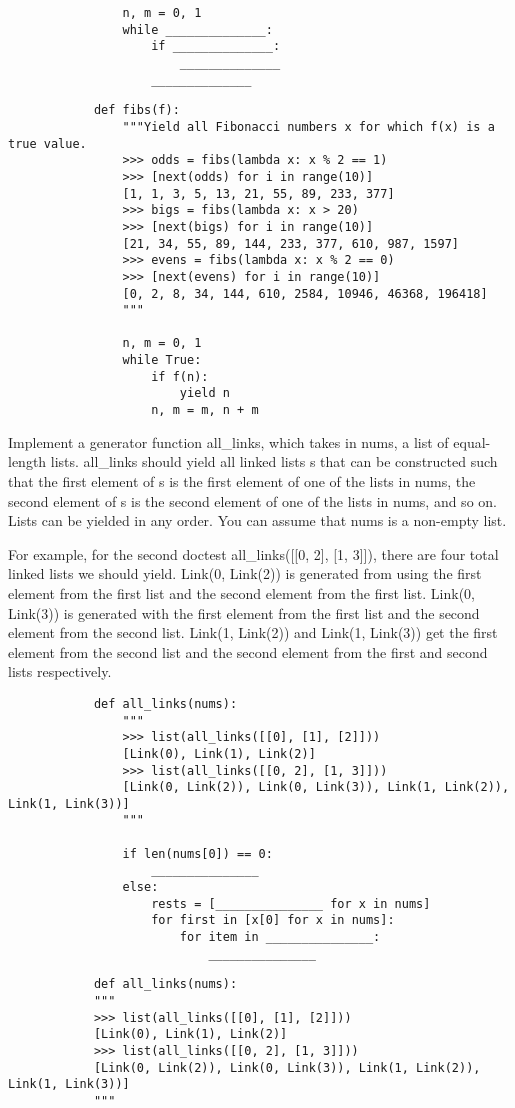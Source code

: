 \documentclass{exam}
\begin{document}
\begin{questions}
\begin{blocksection}
\begin{blocksection}
\begin{lstlisting}
				n, m = 0, 1
				while ______________:
					if ______________:
						______________
					______________
		\end{lstlisting}
	\end{blocksection}
	\begin{solution}
		\begin{lstlisting}
			def fibs(f):
				"""Yield all Fibonacci numbers x for which f(x) is a true value.
				>>> odds = fibs(lambda x: x % 2 == 1)
				>>> [next(odds) for i in range(10)]
				[1, 1, 3, 5, 13, 21, 55, 89, 233, 377]
				>>> bigs = fibs(lambda x: x > 20)
				>>> [next(bigs) for i in range(10)]
				[21, 34, 55, 89, 144, 233, 377, 610, 987, 1597]
				>>> evens = fibs(lambda x: x % 2 == 0)
				>>> [next(evens) for i in range(10)]
				[0, 2, 8, 34, 144, 610, 2584, 10946, 46368, 196418]
				"""
				
				n, m = 0, 1
				while True:
					if f(n):
						yield n
					n, m = m, n + m
		\end{lstlisting}
	\end{solution}
	\begin{blocksection}
		Implement a generator function all_links, which takes in nums, a list of equal-length lists. all_links should yield all linked lists s that can be constructed such that the first element of s is the first element of one of the lists in nums, the second element of s is the second element of one of the lists in nums, and so on. Lists can be yielded in any order. You can assume that nums is a non-empty list.
		
		For example, for the second doctest all_links([[0, 2], [1, 3]]), there are four total linked lists we should yield. Link(0, Link(2)) is generated from using the first element from the first list and the second element from the first list. Link(0, Link(3)) is generated with the first element from the first list and the second element from the second list. Link(1, Link(2)) and Link(1, Link(3)) get the first element from the second list and the second element from the first and second lists respectively.
		\begin{lstlisting}
			def all_links(nums):
				"""
				>>> list(all_links([[0], [1], [2]]))
				[Link(0), Link(1), Link(2)]
				>>> list(all_links([[0, 2], [1, 3]]))
				[Link(0, Link(2)), Link(0, Link(3)), Link(1, Link(2)), Link(1, Link(3))]
				"""
				
				if len(nums[0]) == 0:
					_______________
				else:
					rests = [_______________ for x in nums]
					for first in [x[0] for x in nums]:
						for item in _______________:
							_______________
		\end{lstlisting}
	\end{blocksection}
	\begin{solution}
		\begin{lstlisting}
			def all_links(nums):
			"""
			>>> list(all_links([[0], [1], [2]]))
			[Link(0), Link(1), Link(2)]
			>>> list(all_links([[0, 2], [1, 3]]))
			[Link(0, Link(2)), Link(0, Link(3)), Link(1, Link(2)), Link(1, Link(3))]
			"""
				

\end{lstlisting}
\end{solution}
\end{blocksection}
\end{questions}
\end{document}
